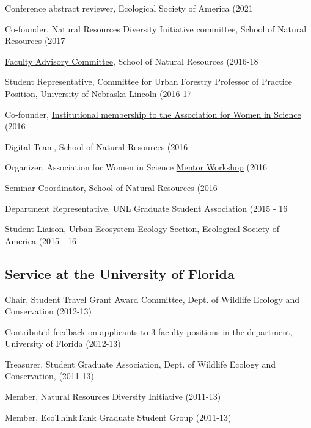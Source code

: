 \documentclass[11pt,]{article}
\providecommand{\tightlist}{%
  \setlength{\itemsep}{0pt}\setlength{\parskip}{0pt}}
\renewenvironment{itemize}{
 \begin{list}{• }{
   \setlength{\leftmargin}{2.5em}
\setlist{before=\setlength{\rightmargin}{\leftmargin}}
   \setlength{\itemsep}{0pt}
 }
}{
 \end{list}
}
\begin{document}
\begin{itemize}
\tightlist
\item
  Conference abstract reviewer, Ecological Society of America (2021
\item
  Co-founder, Natural Resources Diversity Initiative committee, School
  of Natural Resources (2017
\item
  \href{http://snr.unl.edu/employeeinfo/people/committee/facultyadvisory.asp}{Faculty
  Advisory Committee}, School of Natural Resources (2016-18
\item
  Student Representative, Committee for Urban Forestry Professor of
  Practice Position, University of Nebraska-Lincoln (2016-17
\item
  Co-founder,
  \href{http://news.unl.edu/newsrooms/today/article/university-is-institutional-partner-with-association-for-women-in-science/}{Institutional
  membership to the Association for Women in Science} (2016
\item
  Digital Team, School of Natural Resources (2016
\item
  Organizer, Association for Women in Science
  \href{http://snr.unl.edu/registration/AWISMentor/MentorMenteeRegistrationAttendanceCap.aspx?utm_source=Google\&utm_medium=email\&utm_term=\&utm_content=\&utm_campaign=AWIS+Workshop}{Mentor
  Workshop} (2016
\item
  Seminar Coordinator, School of Natural Resources (2016
\item
  Department Representative, UNL Graduate Student Association (2015 - 16
\item
  Student Liaison, \href{http://www.esa.org/urbanecology/}{Urban
  Ecosystem Ecology Section}, Ecological Society of America (2015 - 16
\end{itemize}

\hypertarget{service-at-the-university-of-florida}{%
\subsection{Service at the University of
Florida}\label{service-at-the-university-of-florida}}

\begin{itemize}
\tightlist
\item
  Chair, Student Travel Grant Award Committee, Dept. of Wildlife Ecology
  and Conservation (2012-13)
\item
  Contributed feedback on applicants to 3 faculty positions in the
  department, University of Florida (2012-13)
\item
  Treasurer, Student Graduate Association, Dept. of Wildlife Ecology and
  Conservation, (2011-13)
\item
  Member, Natural Resources Diversity Initiative (2011-13)
\item
  Member, EcoThinkTank Graduate Student Group (2011-13)
\end{itemize}
\end{document}
